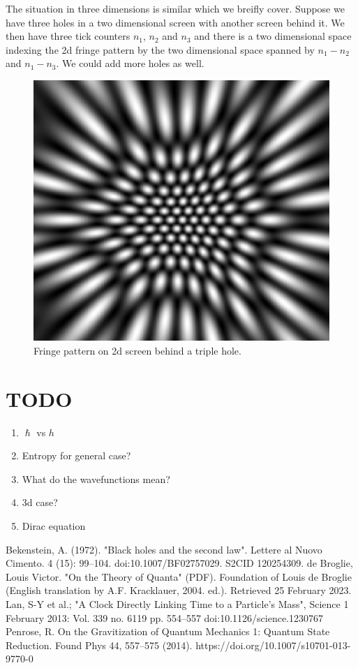 \documentclass[12pt,a4paper]{article}
\begin{document}
The situation in three dimensions is similar which we breifly cover.  Suppose we have three holes in a two dimensional screen with another screen behind it.  We then have three tick counters $n_1$, $n_2$ and $n_3$ and there is a two dimensional space indexing the 2d fringe pattern by the two dimensional space spanned by $n_1 - n_2$ and $n_1 - n_3$.  We could add more holes as well.

\begin{figure}[h!]
\centering
\includegraphics[scale=0.5]{triple_hole.png}
\caption{Fringe pattern on 2d screen behind a triple hole.}
\label{screen}
\end{figure}


\section{TODO}
\begin{enumerate}
\item $\hslash$ vs $h$
\item Entropy for general case?
\item What do the wavefunctions mean?
\item 3d case?
\item Dirac equation
\end{enumerate}

\begin{thebibliography}{10}

 Bekenstein, A. (1972). "Black holes and the second law". Lettere al Nuovo Cimento. 4 (15): 99–104. doi:10.1007/BF02757029. S2CID 120254309.
 de Broglie, Louis Victor. "On the Theory of Quanta" (PDF). Foundation of Louis de Broglie (English translation by A.F. Kracklauer, 2004. ed.). Retrieved 25 February 2023.
  Lan, S-Y et al.; "A Clock Directly Linking Time to a Particle's Mass", Science 1 February 2013: Vol. 339 no. 6119 pp. 554–557 doi:10.1126/science.1230767
 Penrose, R. On the Gravitization of Quantum Mechanics 1: Quantum State Reduction. Found Phys 44, 557–575 (2014). https://doi.org/10.1007/s10701-013-9770-0

\end{thebibliography}
\end{document}
